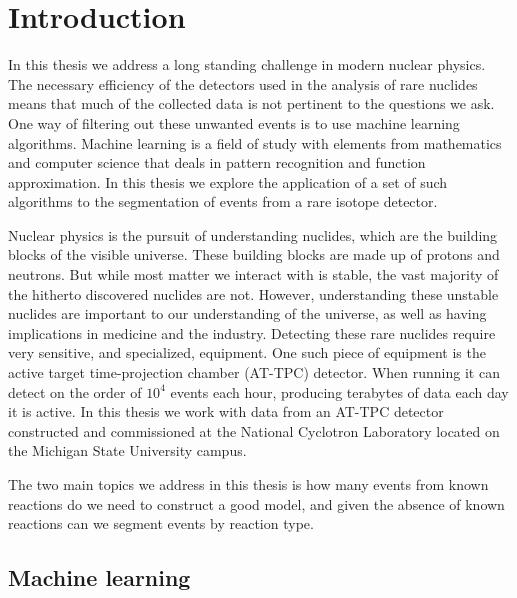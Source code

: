 \chapter{Introduction}\label{ch:introduction}

In this thesis we address a long standing challenge in modern nuclear physics. 
The necessary efficiency of the detectors used in the analysis of rare nuclides means that much of the collected data is not pertinent to the questions we ask. One way of filtering out these unwanted events is to use machine learning algorithms. Machine learning is a field of study with elements from mathematics and computer science that deals in pattern recognition and function approximation. In this thesis we explore the application of a set of such algorithms to the segmentation of events from a rare isotope detector.

Nuclear physics is the pursuit of understanding nuclides, which are the building blocks of the visible universe. These building blocks are made up of protons and neutrons. But while most matter we interact with is stable, the vast majority of the hitherto discovered nuclides are not. However, understanding these unstable nuclides are important to our understanding of the universe, as well as having implications in medicine and the industry. Detecting these rare nuclides require very sensitive, and specialized, equipment. One such piece of equipment is the active target time-projection chamber (AT-TPC) detector. When running it can detect on the order of $10^4$ events each hour, producing terabytes of data each day it is active. In this thesis we work with data from an AT-TPC detector constructed and commissioned at the National Cyclotron Laboratory located on the Michigan State University campus. 

The two main topics we address in this thesis is how many events from known reactions do we need to construct a good model, and given the absence of known reactions can we segment events by reaction type. 

\section{Machine learning}

